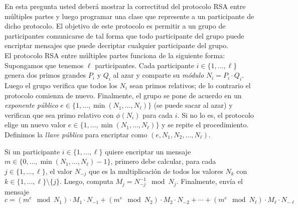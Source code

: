 
En esta pregunta usted deberá mostrar la correctitud del protocolo RSA entre múltiples partes y luego programar una clase que represente a un participante de dicho protocolo. El objetivo de este protocolo es permitir a un grupo de participantes comunicarse de tal forma que todo participante del grupo puede encriptar mensajes que puede decriptar cualquier participante del grupo.\\

El protocolo RSA entre múltiples partes funciona de la siguiente forma: Supongamos que tenemos $\ell$ participantes. Cada participante $i\in\{1,\ldots,\ell\}$ genera dos primos grandes $P_i$ y $Q_i$ al azar y comparte su \emph{módulo} $N_i=P_i\cdot Q_i$. Luego el grupo verifica que todos los $N_i$ sean primos relativos; de lo contrario el protocolo comienza de nuevo. Finalmente, el grupo se pone de acuerdo en un \emph{exponente público} $e\in\{1,\ldots,\min(N_1,\ldots,N_\ell)\}$ (se puede sacar al azar) y verifican que sea primo relativo con $\phi(N_i)$ para cada $i$. Si no lo es, el protocolo elige un nuevo valor $e\in\{1,\ldots,\min(N_1,\ldots,N_\ell)\}$ y se repite el procedimiento. Definimos la \emph{llave pública} para encriptar como $(e,N_1,N_2,\ldots,N_\ell)$.

Si un participante $i\in\{1,\ldots,\ell\}$ quiere encriptar un mensaje $m\in\{0,\ldots,\min(N_1,\ldots,N_\ell)-1\}$, primero debe calcular, para cada $j\in\{1,\ldots,\ell\}$, el valor $N_{-j}$ que es la multiplicación de todos los valores $N_k$ con $k\in\{1,\ldots,\ell\}\setminus\{j\}$. Luego, computa $M_j=N_{-j}^{-1}\!\!\mod N_j$. Finalmente, envía el mensaje 
$$c=(m^e \!\!\! \mod N_1) \cdot M_1\cdot N_{-1} + (m^e \!\!\! \mod N_2)\cdot M_2\cdot N_{-2} + \cdots + (m^e \!\!\! \mod N_\ell)\cdot M_\ell\cdot N_{-\ell}$$

